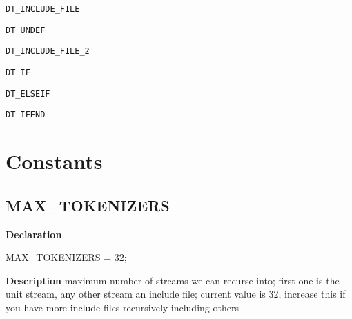 \documentclass{report}
\newif\ifpdf
\begin{document}
\begin{list}{}
\begin{description}
\item[\texttt{DT{\_}INCLUDE{\_}FILE}] \label{PasDoc_Scanner-DT_INCLUDE_FILE}
\index{}
 
\item[\texttt{DT{\_}UNDEF}] \label{PasDoc_Scanner-DT_UNDEF}
\index{}
 
\item[\texttt{DT{\_}INCLUDE{\_}FILE{\_}2}] \label{PasDoc_Scanner-DT_INCLUDE_FILE_2}
\index{}
 
\item[\texttt{DT{\_}IF}] \label{PasDoc_Scanner-DT_IF}
\index{}
 
\item[\texttt{DT{\_}ELSEIF}] \label{PasDoc_Scanner-DT_ELSEIF}
\index{}
 
\item[\texttt{DT{\_}IFEND}] \label{PasDoc_Scanner-DT_IFEND}
\index{}
 
\end{description}


\end{list}
\section{Constants}
\ifpdf
\subsection*{\large{\textbf{MAX{\_}TOKENIZERS}}\normalsize\hspace{1ex}\hrulefill}
\else
\subsection*{MAX{\_}TOKENIZERS}
\fi
\label{PasDoc_Scanner-MAX_TOKENIZERS}
\begin{list}{}{
\setlength{\itemindent}{0cm}
\setlength{\listparindent}{0cm}
\setlength{\leftmargin}{\evensidemargin}
\addtolength{\leftmargin}{\tmplength}
\settowidth{\labelsep}{X}
\addtolength{\leftmargin}{\labelsep}
\setlength{\labelwidth}{\tmplength}
}
\item[\textbf{Declaration}\hfill]
\ifpdf
\begin{flushleft}
\fi
\begin{ttfamily}
MAX{\_}TOKENIZERS = 32;\end{ttfamily}

\ifpdf
\end{flushleft}
\fi

\par
\item[\textbf{Description}]
maximum number of streams we can recurse into; first one is the unit stream, any other stream an include file; current value is 32, increase this if you have more include files recursively including others

\end{list}
\end{document}

